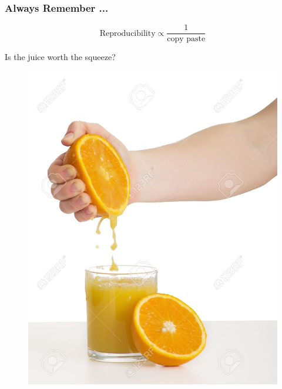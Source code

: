\documentclass[10pt]{beamer}\usepackage[]{graphicx}\usepackage[]{color}
\begin{document}
\begin{frame}
\frametitle{Always Remember ...}

\[ \textrm{Reproducibility} \propto \frac{1}{\textrm{copy paste}}  \]


\end{frame}


\begin{frame}{Is the juice worth the squeeze?}
\begin{figure}[h!]
\centering
\includegraphics[scale=0.40, keepaspectratio]{./juice}
\end{figure}
\end{frame}
\end{document}
